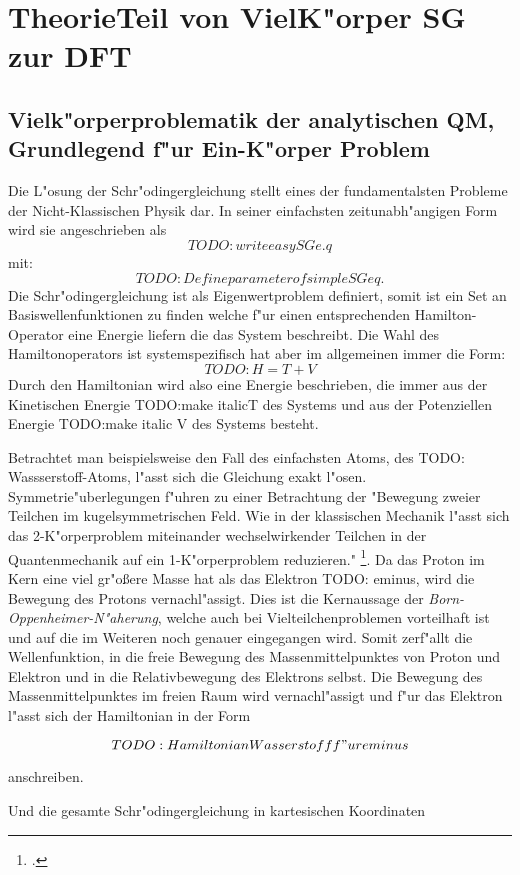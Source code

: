 \chapter{TheorieTeil von VielK"orper SG zur DFT}

\section{Vielk"orperproblematik der analytischen QM, Grundlegend f"ur Ein-K"orper Problem}
Die L"osung der Schr"odingergleichung stellt eines der fundamentalsten Probleme der Nicht-Klassischen Physik dar. In seiner einfachsten zeitunabh"angigen Form wird sie angeschrieben als 
$$TODO: write easy SG e.q$$
mit: 
$$TODO: Define parameter of simple SG eq.$$
Die Schr"odingergleichung ist als Eigenwertproblem definiert, somit ist ein Set an Basiswellenfunktionen zu finden welche f"ur einen entsprechenden Hamilton-Operator eine Energie liefern die das System beschreibt. Die Wahl des Hamiltonoperators ist systemspezifisch hat aber im allgemeinen immer die Form: 
$$TODO: H=T+V$$
Durch den Hamiltonian wird also eine Energie beschrieben, die immer aus der Kinetischen Energie TODO:make italicT des Systems und aus der Potenziellen Energie TODO:make italic V des Systems besteht.


Betrachtet man beispielsweise den Fall des einfachsten Atoms, des TODO: Wassserstoff-Atoms,  l"asst sich die Gleichung exakt l"osen. Symmetrie"uberlegungen f"uhren zu einer Betrachtung der "Bewegung zweier Teilchen  im kugelsymmetrischen Feld. Wie in der klassischen Mechanik l"asst sich das 2-K"orperproblem miteinander wechselwirkender Teilchen in der Quantenmechanik auf ein 1-K"orperproblem reduzieren." \footcite[6]{akt1}. Da das Proton im Kern eine viel gr"oßere Masse hat als das Elektron TODO: eminus, wird die Bewegung des Protons vernachl"assigt. Dies ist die Kernaussage der \textit{Born-Oppenheimer-N"aherung}, welche auch bei Vielteilchenproblemen vorteilhaft ist und auf die im Weiteren noch genauer eingegangen wird. Somit zerf"allt die Wellenfunktion, in die freie Bewegung des Massenmittelpunktes von Proton und Elektron und in die Relativbewegung des Elektrons selbst. Die Bewegung des Massenmittelpunktes im freien Raum wird vernachl"assigt und f"ur das Elektron l"asst sich der Hamiltonian in der Form

$$TODO:Hamiltonian Wasserstoff f"ur eminus$$

anschreiben. 

Und die gesamte Schr"odingergleichung in kartesischen Koordinaten

